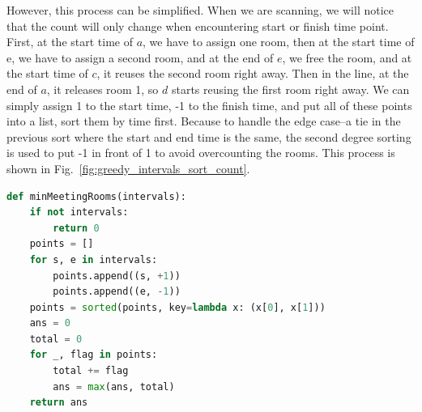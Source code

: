\documentclass[../main.tex]{subfiles}
\begin{document}
However, this process can be simplified. When we are scanning, we will notice that the count will only change when encountering start or finish time point. First, at the start time of $a$, we have to assign one room, then at the start time of e, we have to assign a second room, and at the end of $e$, we free the room, and at the start time of $c$, it reuses the second room right away. Then in the line, at the end of $a$, it releases room 1, so $d$ starts reusing the first room right away. We can simply assign 1 to the start time, -1 to the finish time, and put all of these points into a list, sort them by time first. Because to handle the edge case--a tie in the previous sort where the start and end time is the same, the second degree sorting is used to put -1 in front of 1 to avoid overcounting the rooms. This process is shown in Fig.~\ref{fig:greedy_intervals_sort_count}.
\begin{lstlisting}[language=Python]
def minMeetingRooms(intervals):
    if not intervals:
        return 0
    points = []
    for s, e in intervals:
        points.append((s, +1))
        points.append((e, -1))
    points = sorted(points, key=lambda x: (x[0], x[1]))
    ans = 0
    total = 0
    for _, flag in points:
        total += flag
        ans = max(ans, total)
    return ans
\end{lstlisting}
\end{document}
